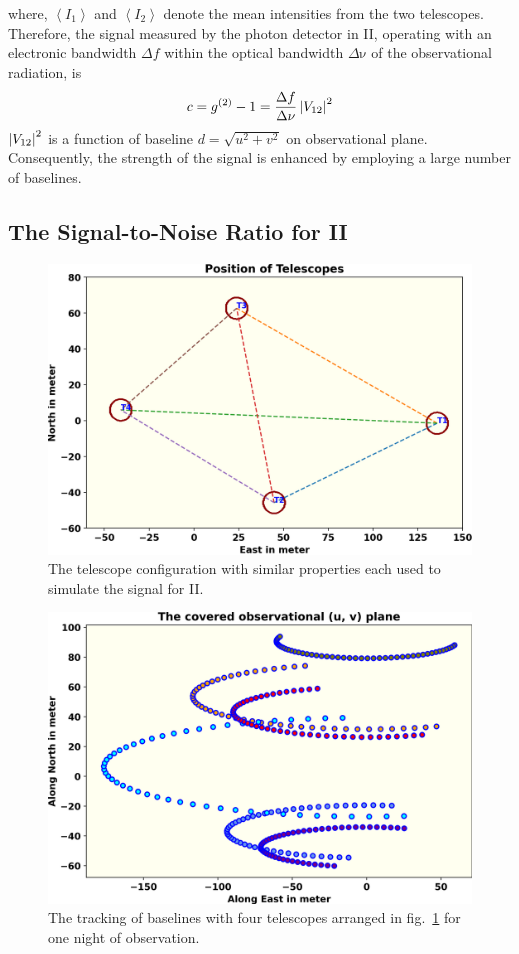 where, $\left\langle I_1 \right\rangle$ and $\left\langle I_2 \right\rangle$ denote the mean intensities from the two telescopes. Therefore, the signal measured by the photon detector in II, operating with an electronic bandwidth $\Delta f$ within the optical bandwidth $\Delta {\mathrm {\nu}}$ of the observational radiation, is
\begin{equation}
	c = g^{(2)} - 1 = \frac{\Delta f}{\Delta \nu} \left|V_{12}\right|^2
	\label{eq:signal}
\end{equation}
$\left|V_{12}\right|^2$ is a function of baseline $d = \sqrt{u^2 + v^2}$ on observational plane. Consequently, the strength of the signal is enhanced by employing a large number of baselines.

\subsection{The Signal-to-Noise Ratio for II}
\begin{figure}
	\centering
	\includegraphics[width=\linewidth]{fig/telescope.png}
	\caption{The telescope configuration with similar properties each used to simulate the signal for II.}
	\label{fig:teles}
\end{figure}
\begin{figure}
	\centering
	\includegraphics[width=\linewidth]{fig/baseline.png}
	\caption{The tracking of baselines with four telescopes arranged in fig.~\ref{fig:teles} for one night of observation.}
	\label{fig:base}
\end{figure}
